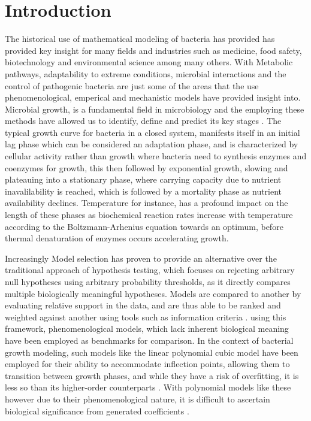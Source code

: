 \documentclass[11pt]{article}
\begin{document}
\pagebreak

\section{Introduction}
The historical use of mathematical modeling of bacteria has provided has provided key insight for many fields and industries such as medicine, food safety, biotechnology and environmental science among many others. With Metabolic pathways, adaptability to  extreme conditions, microbial interactions and the control of pathogenic bacteria are just some of the areas that the use phenomenological, emperical and mechanistic models have provided insight into. Microbial growth, is a fundamental field in microbiology and the employing these methods have allowed us to identify, define and predict its key stages \cite{esser2015modeling}. The typical growth curve for bacteria in a closed system, manifests itself in an initial lag phase which can be considered an adaptation phase, and is characterized by cellular activity rather than growth where bacteria need to synthesis enzymes and coenzymes for growth, this then followed by exponential growth, slowing and plateauing into a stationary phase, where carrying capacity due to nutrient inavalilability is reached, which is followed by a mortality phase as nutrient availability declines\cite{Peleg01122011,maier2015bacterial,lo2023generalized}. Temperature for instance, has a profound impact on the length of these phases as biochemical reaction rates increase with temperature according to the Boltzmann-Arhenius equation towards an optimum, before thermal denaturation of enzymes occurs \cite{michaelis1913kinetik, zwietering1994modeling, dell2011systematic} accelerating growth.   
\setlength{\parskip}{1.2em} %

Increasingly Model selection has proven to provide an alternative over the traditional approach of hypothesis testing, which focuses on rejecting arbitrary null hypotheses using arbitrary probability thresholds, as it directly compares multiple biologically meaningful hypotheses. Models are compared to another by evaluating relative support in the data, and are thus able to be ranked and weighted against another using tools such as information criteria \cite{johnson2004model}. using this framework, phenomenological models, which lack inherent biological meaning have been employed as benchmarks for comparison. In the context of bacterial growth modeling, such models like the linear polynomial cubic model have been employed for their ability to accommodate inflection points, allowing them to transition between growth phases, and while they have a risk of overfitting, it is less so than its higher-order counterparts \cite{garcia2021primary}. With polynomial models like these however due to their phenomenological nature, it is difficult to ascertain biological significance from generated coefficients \cite{Peleg01122011,motulsky2004fitting}.   
\end{document}
